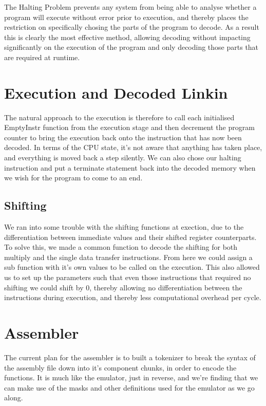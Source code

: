 \documentclass[11pt]{article}
\begin{document}
The Halting Problem prevents any system from being able to analyse whether a program will execute without error prior to execution, and thereby places the restriction on specifically chosing the parts of the program to decode. As a result this is clearly the most effective method, allowing decoding without impacting significantly on the execution of the program and only decoding those parts that are required at runtime.

\section{Execution and Decoded Linkin}

The natural approach to the execution is therefore to call each initialised EmptyInstr function from the execution stage and then decrement the program counter to bring the execution back onto the instruction that has now been decoded. In terms of the CPU state, it's not aware that anything has taken place, and everything is moved back a step silently. We can also chose our halting instruction and put a terminate statement back into the decoded memory when we wish for the program to come to an end.

\subsection{Shifting}

We ran into some trouble with the shifting functions at exection, due to the differentiation between immediate values and their shifted register counterparts. To solve this, we made a common function to decode the shifting for both multiply and the single data transfer instructions. From here we could assign a sub function with it's own values to be called on the execution. This also allowed us to set up the parameters such that even those instructions that required no shifting we could shift by 0, thereby allowing no differentiation between the instructions during execution, and thereby less computational overhead per cycle.

\section{Assembler}

The current plan for the assembler is to built a tokenizer to break the syntax of the assembly file down into it's component chunks, in order to encode the functions. It is much like the emulator, just in reverse, and we're finding that we can make use of the masks and other definitions used for the emulator as we go along. 
\end{document}
